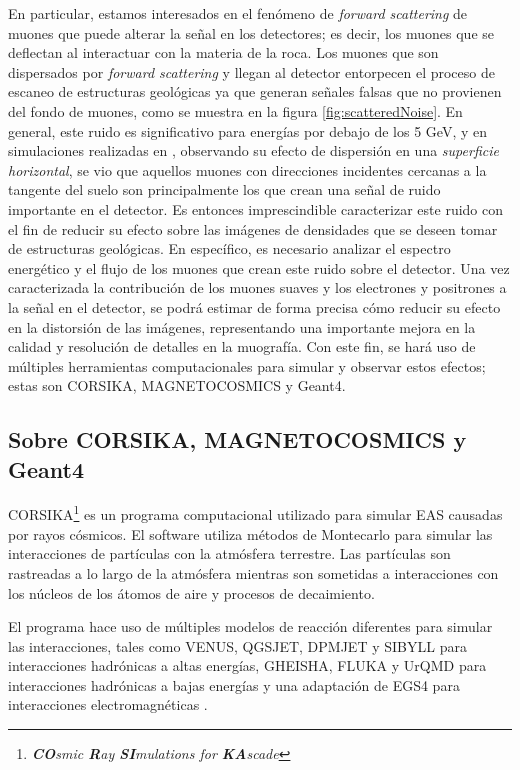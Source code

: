 \documentclass[12pt]{report}
\begin{document}
En particular, estamos interesados en el fenómeno de \textit{forward scattering} de muones que puede alterar la señal en los detectores; es decir, los muones que se deflectan al interactuar con la materia de la roca. Los muones que son dispersados por \textit{forward scattering} y llegan al detector entorpecen el proceso de escaneo de estructuras geológicas ya que generan señales falsas que no provienen del fondo de muones, como se muestra en la figura \ref{fig:scatteredNoise}. En general, este ruido es significativo para energías por debajo de los 5 GeV, y en simulaciones realizadas en \cite{gomez2017forward}, observando su efecto de dispersión en una \textit{superficie horizontal}, se vio que aquellos muones con direcciones incidentes cercanas a la tangente del suelo son principalmente los que crean una señal de ruido importante en el detector. Es entonces imprescindible caracterizar este ruido con el fin de reducir su efecto sobre las imágenes de densidades que se deseen tomar de estructuras geológicas. En específico, es necesario analizar el espectro energético y el flujo de los muones que crean este ruido sobre el detector. Una vez caracterizada la contribución de los muones suaves y los electrones y positrones a la señal en el detector, se podrá estimar de forma precisa cómo reducir su efecto en la distorsión de las imágenes, representando una importante mejora en la calidad y resolución de detalles en la muografía. Con este fin, se hará uso de múltiples herramientas computacionales para simular y observar estos efectos; estas son CORSIKA, MAGNETOCOSMICS y Geant4.



\subsection*{Sobre CORSIKA, MAGNETOCOSMICS y Geant4}

CORSIKA\footnote{\textit{\textbf{CO}smic \textbf{R}ay \textbf{SI}mulations for \textbf{KA}scade}} es un programa computacional utilizado para simular EAS causadas por rayos cósmicos. El software utiliza métodos de Montecarlo para simular las interacciones de partículas con la atmósfera terrestre. Las partículas son rastreadas a lo largo de la atmósfera mientras son sometidas a interacciones con los núcleos de los átomos de aire y procesos de decaimiento.

El programa hace uso de múltiples modelos de reacción diferentes para simular las interacciones, tales como VENUS, QGSJET, DPMJET y SIBYLL para interacciones hadrónicas a altas energías, GHEISHA, FLUKA y UrQMD para interacciones hadrónicas a bajas energías y una adaptación de EGS4 para interacciones electromagnéticas \cite{heck1998corsika}.
\end{document}
